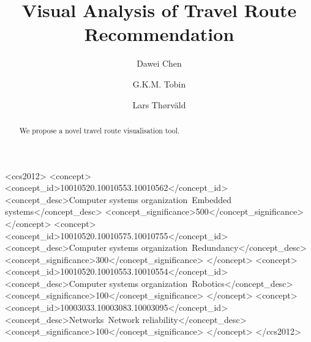 \documentclass[sigconf]{acmart}
\begin{document}
\title{Visual Analysis of Travel Route Recommendation}

\author{Dawei Chen}

\author{G.K.M. Tobin}

\author{Lars Th{\o}rv{\"a}ld}

\renewcommand{\shortauthors}{D. Chen et al.}


\begin{abstract}
We propose a novel travel route visualisation tool. 
\end{abstract}

%
%
\begin{CCSXML}
<ccs2012>
 <concept>
  <concept_id>10010520.10010553.10010562</concept_id>
  <concept_desc>Computer systems organization~Embedded systems</concept_desc>
  <concept_significance>500</concept_significance>
 </concept>
 <concept>
  <concept_id>10010520.10010575.10010755</concept_id>
  <concept_desc>Computer systems organization~Redundancy</concept_desc>
  <concept_significance>300</concept_significance>
 </concept>
 <concept>
  <concept_id>10010520.10010553.10010554</concept_id>
  <concept_desc>Computer systems organization~Robotics</concept_desc>
  <concept_significance>100</concept_significance>
 </concept>
 <concept>
  <concept_id>10003033.10003083.10003095</concept_id>
  <concept_desc>Networks~Network reliability</concept_desc>
  <concept_significance>100</concept_significance>
 </concept>
</ccs2012>  
\end{CCSXML}

\end{document}
